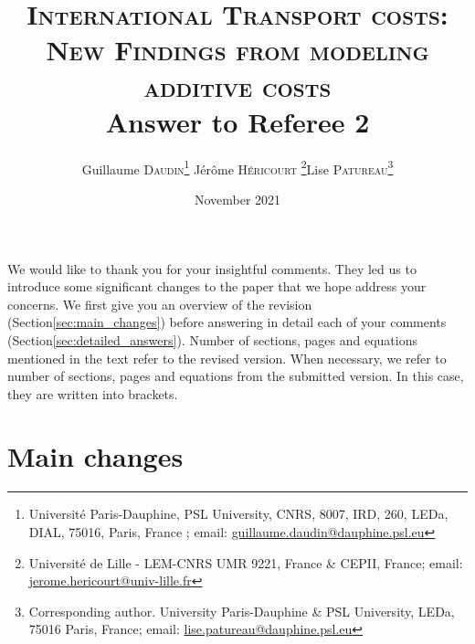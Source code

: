 \documentclass[a4paper,11pt]{article}
\begin{document}
\title{\textsc{International Transport costs:\\New Findings from modeling additive costs} \\
Answer to Referee 2}

\author{Guillaume \textsc{Daudin}\thanks{%
Université Paris-Dauphine, PSL University, CNRS, 8007, IRD, 260, LEDa, DIAL, 75016, Paris, France ; email: \url{guillaume.daudin@dauphine.psl.eu}}  \qquad J\'{e}r\^{o}me \textsc{H\'{e}ricourt} \thanks{Universit\'{e} de Lille - LEM-CNRS UMR 9221, France \& CEPII, France; email: \url{jerome.hericourt@univ-lille.fr}}\qquad Lise \textsc{Patureau}\thanks{Corresponding author.
University Paris-Dauphine \& PSL University, LEDa, 75016 Paris, France;  email: \url{lise.patureau@dauphine.psl.eu} } }


\date{November 2021}
 \maketitle
\bigskip

We would like to thank you for your insightful comments. They led us to introduce some
significant changes to the paper that we hope address your concerns. We first give you an overview
of the revision (Section\ref{sec:main_changes}) before answering in detail each of your comments (Section\ref{sec:detailed_answers}). Number of sections, pages and equations mentioned in the text refer to the revised version. When necessary, we refer to number of sections, pages and equations from the submitted version. In this case, they are written into brackets.

\section{Main changes \label{sec:main_changes}}
\end{document}
